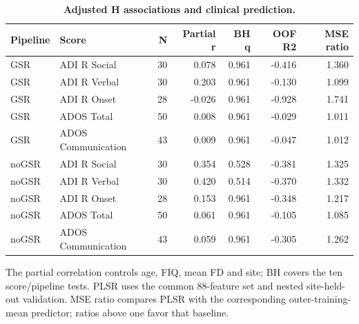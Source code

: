 \begin{table}[H]
\centering\small
\caption{\textbf{Adjusted H associations and clinical prediction.}}\label{tab:clinical}
\begin{tabular}{llrrrrr}
\toprule
Pipeline & Score & N & Partial r & BH q & OOF R2 & MSE ratio \\
\midrule
GSR & ADI R Social & 30 & 0.078 & 0.961 & -0.416 & 1.360 \\
GSR & ADI R Verbal & 30 & 0.203 & 0.961 & -0.130 & 1.099 \\
GSR & ADI R Onset & 28 & -0.026 & 0.961 & -0.928 & 1.741 \\
GSR & ADOS Total & 50 & 0.008 & 0.961 & -0.029 & 1.011 \\
GSR & ADOS Communication & 43 & 0.009 & 0.961 & -0.047 & 1.012 \\
noGSR & ADI R Social & 30 & 0.354 & 0.528 & -0.381 & 1.325 \\
noGSR & ADI R Verbal & 30 & 0.420 & 0.514 & -0.370 & 1.332 \\
noGSR & ADI R Onset & 28 & 0.153 & 0.961 & -0.348 & 1.217 \\
noGSR & ADOS Total & 50 & 0.061 & 0.961 & -0.105 & 1.085 \\
noGSR & ADOS Communication & 43 & 0.059 & 0.961 & -0.305 & 1.262 \\
\bottomrule
\end{tabular}
\begin{flushleft}\footnotesize
The partial correlation controls age, FIQ, mean FD and site; BH covers the ten score/pipeline tests. PLSR uses the common 88-feature set and nested site-held-out validation. MSE ratio compares PLSR with the corresponding outer-training-mean predictor; ratios above one favor that baseline.
\end{flushleft}
\end{table}
